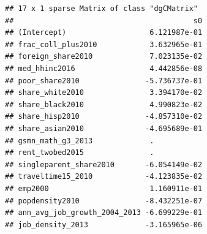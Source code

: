 \documentclass[
]{article}
\newenvironment{Shaded}{\begin{snugshade}}{\end{snugshade}}
\newcommand{\AttributeTok}[1]{\textcolor[rgb]{0.13,0.29,0.53}{#1}}
\newcommand{\ConstantTok}[1]{\textcolor[rgb]{0.56,0.35,0.01}{#1}}
\newcommand{\DecValTok}[1]{\textcolor[rgb]{0.00,0.00,0.81}{#1}}
\newcommand{\FloatTok}[1]{\textcolor[rgb]{0.00,0.00,0.81}{#1}}
\newcommand{\FunctionTok}[1]{\textcolor[rgb]{0.13,0.29,0.53}{\textbf{#1}}}
\newcommand{\NormalTok}[1]{#1}
\newcommand{\OtherTok}[1]{\textcolor[rgb]{0.56,0.35,0.01}{#1}}
\newcommand{\SpecialCharTok}[1]{\textcolor[rgb]{0.81,0.36,0.00}{\textbf{#1}}}
\newcommand{\StringTok}[1]{\textcolor[rgb]{0.31,0.60,0.02}{#1}}
\begin{document}
\begin{verbatim}
## 17 x 1 sparse Matrix of class "dgCMatrix"
##                                         s0
## (Intercept)                   6.121987e-01
## frac_coll_plus2010            3.632965e-01
## foreign_share2010             7.023135e-02
## med_hhinc2016                 4.442856e-08
## poor_share2010               -5.736737e-01
## share_white2010               3.394170e-02
## share_black2010               4.990823e-02
## share_hisp2010               -4.857310e-02
## share_asian2010              -4.695689e-01
## gsmn_math_g3_2013             .           
## rent_twobed2015               .           
## singleparent_share2010       -6.054149e-02
## traveltime15_2010            -4.123835e-02
## emp2000                       1.160911e-01
## popdensity2010               -8.432251e-07
## ann_avg_job_growth_2004_2013 -6.699229e-01
## job_density_2013             -3.165965e-06
\end{verbatim}

\begin{Shaded}
\end{Shaded}
\end{document}
